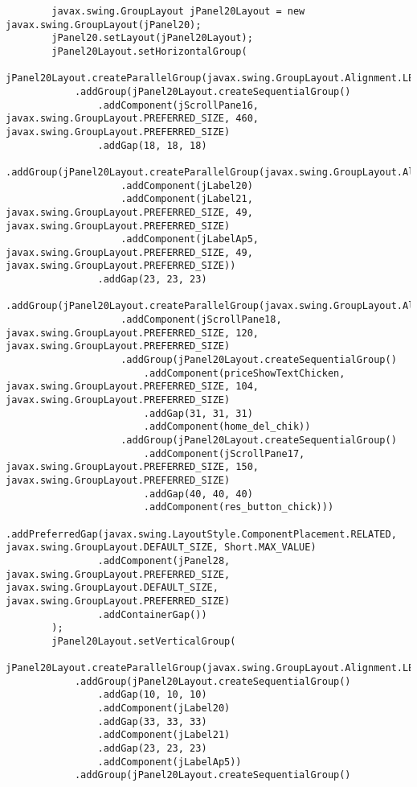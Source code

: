 \documentclass[12pt,a4paper]{article}
\begin{document}
\begin{lstlisting}
        javax.swing.GroupLayout jPanel20Layout = new javax.swing.GroupLayout(jPanel20);
        jPanel20.setLayout(jPanel20Layout);
        jPanel20Layout.setHorizontalGroup(
            jPanel20Layout.createParallelGroup(javax.swing.GroupLayout.Alignment.LEADING)
            .addGroup(jPanel20Layout.createSequentialGroup()
                .addComponent(jScrollPane16, javax.swing.GroupLayout.PREFERRED_SIZE, 460, javax.swing.GroupLayout.PREFERRED_SIZE)
                .addGap(18, 18, 18)
                .addGroup(jPanel20Layout.createParallelGroup(javax.swing.GroupLayout.Alignment.LEADING)
                    .addComponent(jLabel20)
                    .addComponent(jLabel21, javax.swing.GroupLayout.PREFERRED_SIZE, 49, javax.swing.GroupLayout.PREFERRED_SIZE)
                    .addComponent(jLabelAp5, javax.swing.GroupLayout.PREFERRED_SIZE, 49, javax.swing.GroupLayout.PREFERRED_SIZE))
                .addGap(23, 23, 23)
                .addGroup(jPanel20Layout.createParallelGroup(javax.swing.GroupLayout.Alignment.LEADING)
                    .addComponent(jScrollPane18, javax.swing.GroupLayout.PREFERRED_SIZE, 120, javax.swing.GroupLayout.PREFERRED_SIZE)
                    .addGroup(jPanel20Layout.createSequentialGroup()
                        .addComponent(priceShowTextChicken, javax.swing.GroupLayout.PREFERRED_SIZE, 104, javax.swing.GroupLayout.PREFERRED_SIZE)
                        .addGap(31, 31, 31)
                        .addComponent(home_del_chik))
                    .addGroup(jPanel20Layout.createSequentialGroup()
                        .addComponent(jScrollPane17, javax.swing.GroupLayout.PREFERRED_SIZE, 150, javax.swing.GroupLayout.PREFERRED_SIZE)
                        .addGap(40, 40, 40)
                        .addComponent(res_button_chick)))
                .addPreferredGap(javax.swing.LayoutStyle.ComponentPlacement.RELATED, javax.swing.GroupLayout.DEFAULT_SIZE, Short.MAX_VALUE)
                .addComponent(jPanel28, javax.swing.GroupLayout.PREFERRED_SIZE, javax.swing.GroupLayout.DEFAULT_SIZE, javax.swing.GroupLayout.PREFERRED_SIZE)
                .addContainerGap())
        );
        jPanel20Layout.setVerticalGroup(
            jPanel20Layout.createParallelGroup(javax.swing.GroupLayout.Alignment.LEADING)
            .addGroup(jPanel20Layout.createSequentialGroup()
                .addGap(10, 10, 10)
                .addComponent(jLabel20)
                .addGap(33, 33, 33)
                .addComponent(jLabel21)
                .addGap(23, 23, 23)
                .addComponent(jLabelAp5))
            .addGroup(jPanel20Layout.createSequentialGroup()

\end{lstlisting}
\end{document}
